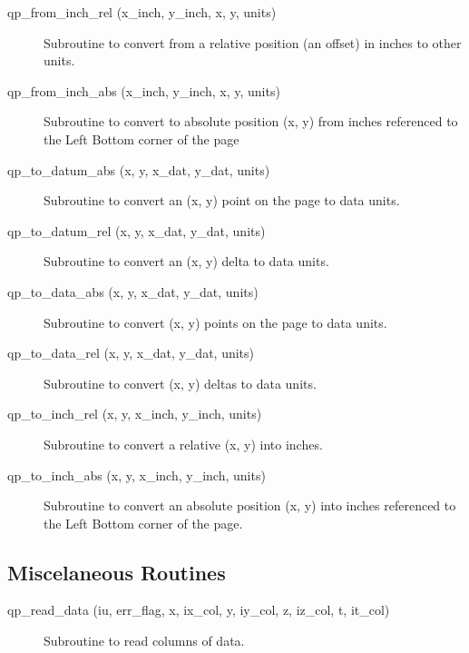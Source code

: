 \begin{description}

\item[qp\_from\_inch\_rel (x\_inch, y\_inch, x, y, units)] \Newline 
     Subroutine to convert from a relative position (an offset) in inches
     to other units.

\item[qp\_from\_inch\_abs (x\_inch, y\_inch, x, y, units)] \Newline 
     Subroutine to convert to absolute position (x, y) from inches referenced
     to the Left Bottom corner of the page

\item[qp\_to\_datum\_abs (x, y, x\_dat, y\_dat, units)] \Newline 
     Subroutine to convert an (x, y) point on the page to data units.

\item[qp\_to\_datum\_rel (x, y, x\_dat, y\_dat, units)] \Newline 
     Subroutine to convert an (x, y) delta to data units.

\item[qp\_to\_data\_abs (x, y, x\_dat, y\_dat, units)] \Newline 
     Subroutine to convert (x, y) points on the page to data units.

\item[qp\_to\_data\_rel (x, y, x\_dat, y\_dat, units)] \Newline 
     Subroutine to convert (x, y) deltas to data units.

\item[qp\_to\_inch\_rel (x, y, x\_inch, y\_inch, units)] \Newline 
     Subroutine to convert a relative (x, y) into inches.

\item[qp\_to\_inch\_abs (x, y, x\_inch, y\_inch, units)] \Newline 
     Subroutine to convert an absolute position (x, y) into inches referenced
     to the Left Bottom corner of the page.

\end{description}

\subsection{Miscelaneous Routines}

\begin{description}

\item[qp\_read\_data (iu, err\_flag, x, ix\_col, y, iy\_col, z, iz\_col, 
                                                               t, it\_col) ] \Newline 
     Subroutine to read columns of data.

\end{description}

